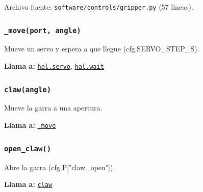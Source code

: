 \noindent Archivo fuente: \texttt{software/controls/gripper.py} (57 l\'ineas).

\subsubsection{\texttt{\_\allowbreak{}move(port, angle)}}\label{fn:gripper:-move}
\noindent Mueve un servo y espera a que llegue (cfg.SERVO\_STEP\_S).

\par{}\par\smallskip
\noindent\textbf{Llama a:} \hyperref[fn:hal:servo]{\texttt{hal.servo}}, \hyperref[fn:hal:wait]{\texttt{hal.wait}}\par

\subsubsection{\texttt{claw(angle)}}\label{fn:gripper:claw}
\noindent Mueve la garra a una apertura.

\par{}\par\smallskip
\noindent\textbf{Llama a:} \hyperref[fn:gripper:-move]{\texttt{\_\allowbreak{}move}}\par

\subsubsection{\texttt{open\_\allowbreak{}claw()}}\label{fn:gripper:open-claw}
\noindent Abre la garra (cfg.P["claw\_open"]).

\noindent\textbf{Llama a:} \hyperref[fn:gripper:claw]{\texttt{claw}}\par

